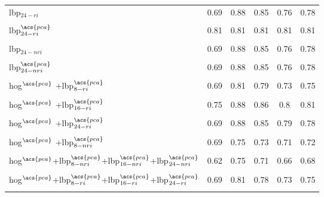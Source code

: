 \begin{table*}
{\begin{tabular}{l ccccc}
  \acs{lbp}$_{24-ri}$ & 0.69 & 0.88 & 0.85 & 0.76 & 0.78\\
  \multicolumn{6}{c}{}\\[-1.5ex] 
 
  \acs{lbp}$_{24-ri}^{\acs{pca}}$ & 0.81 & 0.81 & 0.81 & 0.81 & 0.81\\
  \multicolumn{6}{c}{}\\[-1.5ex]  

  \acs{lbp}$_{24-nri}$ & 0.69 & 0.88 & 0.85 & 0.76 & 0.78\\
  \multicolumn{6}{c}{}\\[-1.5ex] 

  \acs{lbp}$_{24-nri}^{\acs{pca}}$ & 0.69 & 0.88 & 0.85 & 0.76 & 0.78\\
  \multicolumn{6}{c}{}\\[-1.5ex]     

   \acs{hog}$^{\acs{pca}}$ +\acs{lbp}$_{8-ri}^{\acs{pca}}$ & 0.69 & 0.81 & 0.79 & 0.73 & 0.75\\
  \multicolumn{6}{c}{}\\[-1.5ex]
  
   \acs{hog}$^{\acs{pca}}$ +\acs{lbp}$_{16-ri}^{\acs{pca}}$ & 0.75 & 0.88 & 0.86 & 0.8 & 0.81\\
  \multicolumn{6}{c}{}\\[-1.5ex]
  
   \acs{hog}$^{\acs{pca}}$ +\acs{lbp}$_{24-ri}^{\acs{pca}}$ & 0.69 & 0.88 & 0.85 & 0.79 & 0.78\\
  \multicolumn{6}{c}{}\\[-1.5ex]

 \acs{hog}$^{\acs{pca}}$ +\acs{lbp}$_{8-nri}^{\acs{pca}}$ & 0.69 & 0.75 & 0.73 & 0.71 & 0.72\\
  \multicolumn{6}{c}{}\\[-1.5ex]
  
  \acs{hog}$^{\acs{pca}}$+\acs{lbp}$_{8-nri}^{\acs{pca}}$+\acs{lbp}$_{16-nri}^{\acs{pca}}$+\acs{lbp}$_{24-nri}^{\acs{pca}}$ & 0.62 & 0.75 & 0.71 & 0.66 & 0.68 \\
  \multicolumn{6}{c}{}\\[-1.5ex]

  \acs{hog}$^{\acs{pca}}$+\acs{lbp}$_{8-ri}^{\acs{pca}}$+\acs{lbp}$_{16-ri}^{\acs{pca}}$+\acs{lbp}$_{24-ri}^{\acs{pca}}$ & 0.69 & 0.81 & 0.78 & 0.73 & 0.75 \\
  \multicolumn{6}{c}{}\\[-1.5ex]
 
\bottomrule
\end{tabular}}
\end{table*}


